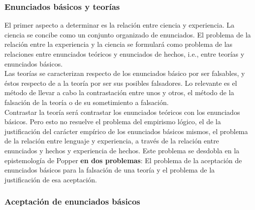 \documentclass[a4paper, 11pt, twocolumn, spanish]{article}
\begin{document}
\subsubsection{Enunciados básicos y teorías}
\label{sec:org0edbc97}
El primer aspecto a determinar es la relación entre ciencia y
experiencia. La ciencia se concibe como un conjunto organizado de
enunciados. El problema de la relación entre la experiencia y la
ciencia se formulará como problema de las relaciones entre enunciados
teóricos y enunciados de hechos, i.e., entre teorías y enunciados
básicos.\\[0pt]
Las teorías se caracterizan respecto de los enunciados básico por ser
falsables, y éstos respecto de a la teoría por ser sus posibles
falsadores. Lo relevante es el método de llevar a cabo la
contrastación entre unos y otros, el método de la falsación de la
teoría o de su sometimiento a falsación.\\[0pt]

Contrastar la teoría será contrastar los enunciados teóricos con los
enunciados básicos. Pero esto no resuelve el problema del empirismo
lógico, el de la justificación del carácter empírico de los enunciados
básicos mismos, el problema de la relación entre lenguaje y
experiencia, a través de la relación entre enunciados y hechos y
experiencia de hechos. Este problema se desdobla en la epistemología
de Popper \textbf{en dos problemas}: El problema de la aceptación de
enunciados básicos para la falsación de una teoría y el problema de la
justificación de esa aceptación.

\subsubsection{Aceptación de enunciados básicos}
\label{sec:org3e6adef}
\end{document}
